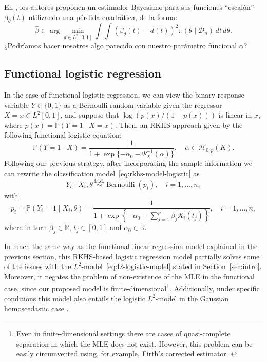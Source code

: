 \documentclass[ba]{imsart}
\numberwithin{equation}{section}
\theoremstyle{plain}
\newcommand{\R}{\mathbb{R}}
\newenvironment{comment}
{
\noindent \em \color{red}
}
{
\color{black}
}
\begin{document}
\begin{comment}
  En \citet[Sec.~2.5]{grollemund2019bayesian}, los autores proponen un estimador Bayesiano para sus funciones ``escalón'' \(\beta_\theta(t)\) utilizando una pérdida cuadrática, de la forma:
  \[
    \hat \beta \in \arg\min_{d\in L^2[0, 1]} \int\int (\beta_\theta(t) - d(t))^2 \pi(\theta\mid \mathcal D_n)\, dt\, d\theta.
  \]
  ¿Podríamos hacer nosotros algo parecido con nuestro parámetro funcional \(\alpha\)?
\end{comment}

\subsection{Functional logistic regression}\label{sec:rkhs-logistic-model}

In the case of functional logistic regression, we can view the binary response variable \(Y\in\{0, 1\}\) as a Bernoulli random variable given the regressor \(X=x \in L^2[0, 1]\), and suppose that \(\log\left(p(x)/(1-p(x))\right)\) is linear in \(x\), where \(p(x)=\mathbb P(Y=1\mid X=x)\). Then, an RKHS approach given by the following functional logistic equation:
\begin{equation}\label{eq:rkhs-model-logistic}
  \mathbb P(Y=1 \mid X) = \frac{1}{1 + \exp\{-\alpha_0 - \Psi^{-1}_X(\alpha)\}}, \quad \alpha \in \mathcal H_{0,p}(K).
\end{equation}
Following our previous strategy, after incorporating the sample information we can rewrite the classification model~\eqref{eq:rkhs-model-logistic} as
\begin{equation}\label{eq:rkhs-model-logistic-2}
Y_i \mid X_i,\theta \ \stackrel{\text{i.i.d.}}{\sim} \operatorname{Bernoulli}(p_i), \quad i=1,\dots, n,
\end{equation}
with
\begin{equation}\label{eq:rkhs-model-logistic-2-parameter}
  p_i = \mathbb P(Y_i=1 \mid X_i,\theta) = \frac{1}{\displaystyle 1 + \exp\left\{-\alpha_0 - \sum_{j=1}^p \beta_j X_i(t_j)\right\}}, \quad i=1,\dots, n,
\end{equation}
where in turn \(\beta_j\in\R\), \(t_j\in[0, 1]\) and \(\alpha_0\in\R\).

In much the same way as the functional linear regression model explained in the previous section, this RKHS-based logistic regression model partially solves some of the issues with the \(L^2\)-model~\eqref{eq:l2-logistic-model} stated in Section~\ref{sec:intro}. Moreover, it negates the problem of non-existence of the MLE in the functional case, since our proposed model is finite-dimensional\footnote{Even in finite-dimensional settings there are cases of quasi-complete separation in which the MLE does not exist. However, this problem can be easily circumvented using, for example, Firth's corrected estimator \citep{firth1993bias}.}. Additionally, under specific conditions this model also entails the logistic \(L^2\)-model in the Gaussian homoscedastic case \citep[see][Th.~1]{buenolarraz2021functional}.
\end{document}
